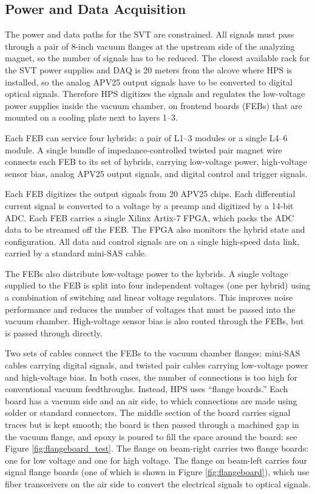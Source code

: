 \subsection{Power and Data Acquisition}
The power and data paths for the SVT are constrained.
All signals must pass through a pair of 8-inch vacuum flanges at the upstream side of the analyzing magnet, so the number of signals has to be reduced.
The closest available rack for the SVT power supplies and DAQ is 20 meters from the alcove where HPS is installed, so the analog APV25 output signals have to be converted to digital optical signals.
Therefore HPS digitizes the signals and regulates the low-voltage power supplies inside the vacuum chamber, on frontend boards (FEBs) that are mounted on a cooling plate next to layers 1--3.

Each FEB can service four hybrids: a pair of L1--3 modules or a single L4--6 module.
A single bundle of impedance-controlled twisted pair magnet wire connects each FEB to its set of hybrids, carrying low-voltage power, high-voltage sensor bias, analog APV25 output signals, and digital control and trigger signals.

Each FEB digitizes the output signals from 20 APV25 chips.
Each differential current signal is converted to a voltage by a preamp and digitized by a 14-bit ADC.
Each FEB carries a single Xilinx Artix-7 FPGA, which packs the ADC data to be streamed off the FEB.
The FPGA also monitors the hybrid state and configuration.
All data and control signals are on a single high-speed data link, carried by a standard mini-SAS cable.

The FEBs also distribute low-voltage power to the hybrids.
A single voltage supplied to the FEB is split into four independent voltages (one per hybrid) using a combination of switching and linear voltage regulators.
This improves noise performance and reduces the number of voltages that must be passed into the vacuum chamber.
High-voltage sensor bias is also routed through the FEBs, but is passed through directly.

Two sets of cables connect the FEBs to the vacuum chamber flanges: mini-SAS cables carrying digital signals, and twisted pair cables carrying low-voltage power and high-voltage bias.
In both cases, the number of connections is too high for conventional vacuum feedthroughs.
Instead, HPS uses ``flange boards.''
Each board has a vacuum side and an air side, to which connections are made using solder or standard connectors.
The middle section of the board carries signal traces but is kept smooth; the board is then passed through a machined gap in the vacuum flange, and epoxy is poured to fill the space around the board: see Figure \ref{fig:flangeboard_test}.
The flange on beam-right carries two flange boards: one for low voltage and one for high voltage.
The flange on beam-left carries four signal flange boards (one of which is shown in Figure \ref{fig:flangeboard}), which use fiber transceivers on the air side to convert the electrical signals to optical signals.

